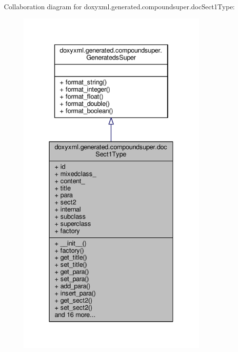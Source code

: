 Collaboration diagram for doxyxml.\+generated.\+compoundsuper.\+doc\+Sect1\+Type\+:
\nopagebreak
\begin{figure}[H]
\begin{center}
\leavevmode
\includegraphics[width=270pt]{dd/d39/classdoxyxml_1_1generated_1_1compoundsuper_1_1docSect1Type__coll__graph}
\end{center}
\end{figure}
